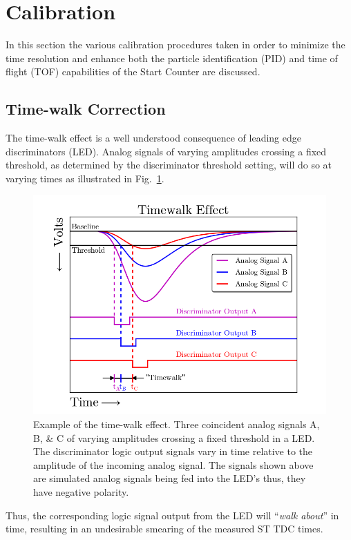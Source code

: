 \section{Calibration} \label{sec:calib}

In this section the various calibration procedures taken in order to minimize the time resolution and enhance both the particle identification (PID) and time of flight (TOF) capabilities of the Start Counter are discussed.

\subsection{Time-walk Correction} \label{sec:calib_tw}

The time-walk effect is a well understood consequence of leading edge discriminators (LED).  Analog signals of varying amplitudes crossing a fixed threshold, as determined by the discriminator threshold setting, will do so at varying times as illustrated in Fig.~\ref{fig:time_walk_effect}.
	\begin{figure}[!htb]
		\centering
		\includegraphics[width=1.0\columnwidth]{calibration/figs/time_walk_effect}
		\caption{Example of the time-walk effect. Three coincident analog signals A, B, \& C of varying amplitudes crossing a fixed threshold in a LED. The discriminator logic output signals vary in time relative to the amplitude of the incoming analog signal.  The signals shown above are simulated analog signals being fed into the LED's thus, they have negative polarity.}
		\label{fig:time_walk_effect}
	\end{figure}
Thus, the corresponding logic signal output from the LED will ``\textit{walk about}'' in time, resulting in an undesirable smearing of the measured ST TDC times.


